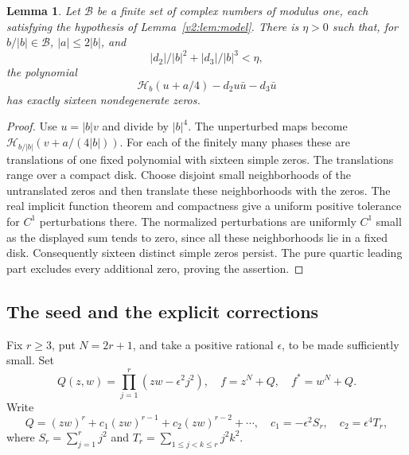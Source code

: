 \documentclass[UTF8,11pt]{ctexart}
\newtheorem{lem}[thm]{Lemma}
\theoremstyle{definition}
\numberwithin{equation}{section}
\begin{document}
\begin{lem}\label{v2:lem:stability}
Let $\mathcal B$ be a finite set of complex numbers of modulus one,
each satisfying the hypothesis of Lemma~\ref{v2:lem:model}.
There is $\eta>0$ such that, for $b/|b|\in\mathcal B$,
$|a|\le2|b|$, and
\[
 |d_2|/|b|^2+|d_3|/|b|^3<\eta,
\]
the polynomial
\begin{equation}\label{v2:eq:perturbedmodel}
 \mathcal H_b(u+a/4)-d_2u\bar u-d_3\bar u
\end{equation}
has exactly sixteen nondegenerate zeros.
\end{lem}
\begin{proof}
Use $u=|b|v$ and divide by $|b|^4$.
The unperturbed maps become
$\mathcal H_{b/|b|}(v+a/(4|b|))$.
For each of the finitely many phases these are translations of one
fixed polynomial with sixteen simple zeros. The translations range
over a compact disk. Choose disjoint small neighborhoods of the
untranslated zeros and then translate these neighborhoods with the
zeros. The real implicit function theorem and compactness give a
uniform positive tolerance for $C^1$ perturbations there. The normalized
perturbations are uniformly $C^1$ small as the displayed sum tends to
zero, since all these neighborhoods lie in a fixed disk. Consequently
sixteen distinct simple zeros persist. The pure quartic leading part
excludes every additional zero, proving the assertion.
\end{proof}

\subsection{The seed and the explicit corrections}

Fix $r\ge3$, put $N=2r+1$, and take a positive rational $\epsilon$,
to be made sufficiently small. Set
\begin{equation}\label{v2:eq:seed}
 Q(z,w)=\prod_{j=1}^r(zw-\epsilon^2j^2),\quad
 f=z^N+Q,\quad f^*=w^N+Q.
\end{equation}
Write
\begin{equation}\label{v2:eq:radialcoeff}
 Q=(zw)^r+c_1(zw)^{r-1}+c_2(zw)^{r-2}+\cdots,
 \quad
 c_1=-\epsilon^2 S_r,\quad c_2=\epsilon^4 T_r,
\end{equation}
where $S_r=\sum_{j=1}^rj^2$ and
$T_r=\sum_{1\le j<k\le r}j^2k^2$.
\end{document}
